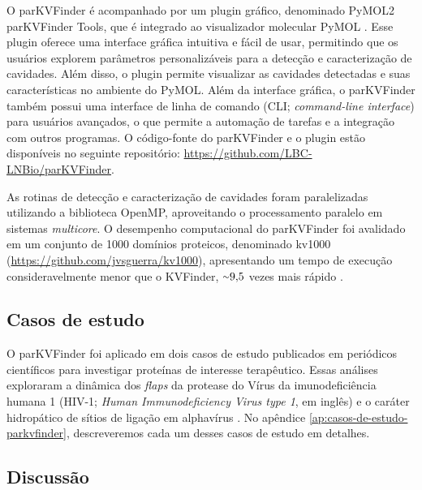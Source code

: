 \documentclass[Portugues]{phdquali}
\newcommand{\aproximadamente}{\raise.2ex\hbox{$\scriptstyle\sim$}}
\begin{document}
O parKVFinder é acompanhado por um plugin gráfico, denominado PyMOL2 parKVFinder Tools, que é integrado ao visualizador molecular PyMOL \cite{pymol}. Esse plugin oferece uma interface gráfica intuitiva e fácil de usar, permitindo que os usuários explorem parâmetros personalizáveis para a detecção e caracterização de cavidades. Além disso, o plugin permite visualizar as cavidades detectadas e suas características no ambiente do PyMOL. Além da interface gráfica, o parKVFinder também possui uma interface de linha de comando (CLI; \textit{command-line interface}) para usuários avançados, o que permite a automação de tarefas e a integração com outros programas. O código-fonte do parKVFinder e o plugin estão disponíveis no seguinte repositório: \url{https://github.com/LBC-LNBio/parKVFinder}.

As rotinas de detecção e caracterização de cavidades foram paralelizadas utilizando a biblioteca OpenMP, aproveitando o processamento paralelo em sistemas \textit{multicore}. O desempenho computacional do parKVFinder foi avalidado em um conjunto de 1000 domínios proteicos, denominado kv1000 (\url{https://github.com/jvsguerra/kv1000}), apresentando um tempo de execução consideravelmente menor que o KVFinder, $\aproximadamente9{,}5$ vezes mais rápido \cite{guerra2019,guerra2020}.


\subsection{Casos de estudo}

O parKVFinder foi aplicado em dois casos de estudo publicados em periódicos científicos para investigar proteínas de interesse terapêutico. Essas análises exploraram a dinâmica dos \textit{flaps} da protease do Vírus da imunodeficiência humana 1 (HIV-1; \textit{Human Immunodeficiency Virus type 1}, em inglês) \cite{guerra2020} e o caráter hidropático de sítios de ligação em alphavírus \cite{ribeiro2021}. No apêndice \ref{ap:casos-de-estudo-parkvfinder}, descreveremos cada um desses casos de estudo em detalhes.


\subsection{Discussão}
\end{document}
